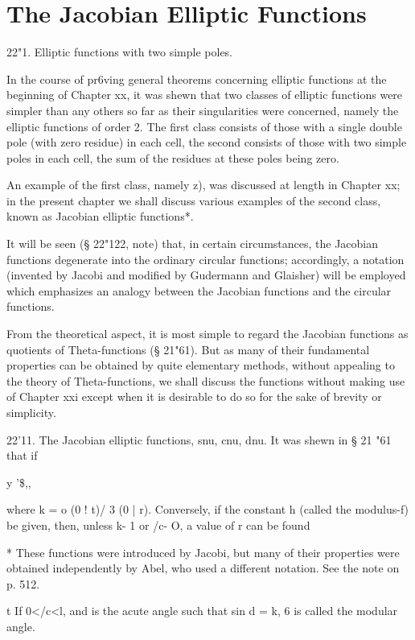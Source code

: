 \chapter{The Jacobian Elliptic Functions} 

22"1. Elliptic functions with two simple poles.

In the course of pr6ving general theorems concerning elliptic
functions at the beginning of Chapter xx, it was shewn that two
classes of elliptic functions were simpler than any others so far as
their singularities were concerned, namely the elliptic functions of
order 2. The first class consists of those with a single double pole
(with zero residue) in each cell, the second consists of those with
two simple poles in each cell, the sum of the residues at these poles
being zero.

An example of the first class, namely z), was discussed at length in
Chapter xx; in the present chapter we shall discuss various examples
of the second class, known as Jacobian elliptic functions*.

It will be seen (§ 22"122, note) that, in certain circumstances, the
Jacobian functions degenerate into the ordinary circular functions;
accordingly, a notation (invented by Jacobi and modified by Gudermann
and Glaisher) will be employed which emphasizes an analogy between the
Jacobian functions and the circular functions.

From the theoretical aspect, it is most simple to regard the Jacobian
functions as quotients of Theta-functions (§ 21"61). But as many of
their fundamental properties can be obtained by quite elementary
methods, without appealing to the theory of Theta-functions, we shall
discuss the functions without making use of Chapter xxi except when it
is desirable to do so for the sake of brevity or simplicity.

22'11. The Jacobian elliptic functions, snu, cnu, dnu. It was shewn in
§ 21 "61 that if

y '\$,,%

where k = o (0 ! t)/ 3 (0 | r). Conversely, if the constant h (called
the modulus-f) be given, then, unless k- 1 or /c- O, a value of r can
be found

* These functions were introduced by Jacobi, but many of their
properties were obtained independently by Abel, who used a different
notation. See the note on p. 512.

t If 0</c<l, and is the acute angle such that sin d = k, 6 is called
the modular angle.

